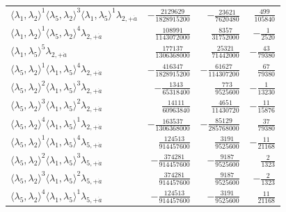 \begin{longtable}{@{}lrrr@{}}
$\langle\lambda_1,\lambda_2\rangle^{1}\langle\lambda_5,\lambda_2\rangle^{3}\langle\lambda_1,\lambda_5\rangle^{1}\lambda_{2,+\dot a}$ & $-\frac{2129629}{1828915200}$ & $-\frac{23621}{7620480}$ & $\frac{499}{105840}$ \\
$\langle\lambda_1,\lambda_2\rangle^{1}\langle\lambda_5,\lambda_2\rangle^{4}\lambda_{2,+\dot a}$ & $\frac{108991}{1143072000}$ & $\frac{8357}{31752000}$ & $-\frac{1}{2520}$ \\
$\langle\lambda_1,\lambda_5\rangle^{5}\lambda_{2,+\dot a}$ & $\frac{177137}{1306368000}$ & $\frac{25321}{71442000}$ & $-\frac{43}{79380}$ \\
$\langle\lambda_5,\lambda_2\rangle^{1}\langle\lambda_1,\lambda_5\rangle^{4}\lambda_{2,+\dot a}$ & $-\frac{416347}{1828915200}$ & $-\frac{61627}{114307200}$ & $\frac{67}{79380}$ \\
$\langle\lambda_5,\lambda_2\rangle^{2}\langle\lambda_1,\lambda_5\rangle^{3}\lambda_{2,+\dot a}$ & $-\frac{1343}{65318400}$ & $\frac{773}{9525600}$ & $-\frac{1}{13230}$ \\
$\langle\lambda_5,\lambda_2\rangle^{3}\langle\lambda_1,\lambda_5\rangle^{2}\lambda_{2,+\dot a}$ & $\frac{14111}{60963840}$ & $\frac{4651}{11430720}$ & $-\frac{11}{15876}$ \\
$\langle\lambda_5,\lambda_2\rangle^{4}\langle\lambda_1,\lambda_5\rangle^{1}\lambda_{2,+\dot a}$ & $-\frac{163537}{1306368000}$ & $-\frac{85129}{285768000}$ & $\frac{37}{79380}$ \\
$\langle\lambda_5,\lambda_2\rangle^{1}\langle\lambda_1,\lambda_5\rangle^{4}\lambda_{5,+\dot a}$ & $\frac{124513}{914457600}$ & $\frac{3191}{9525600}$ & $-\frac{11}{21168}$ \\
$\langle\lambda_5,\lambda_2\rangle^{2}\langle\lambda_1,\lambda_5\rangle^{3}\lambda_{5,+\dot a}$ & $-\frac{374281}{914457600}$ & $-\frac{9187}{9525600}$ & $\frac{2}{1323}$ \\
$\langle\lambda_5,\lambda_2\rangle^{3}\langle\lambda_1,\lambda_5\rangle^{2}\lambda_{5,+\dot a}$ & $\frac{374281}{914457600}$ & $\frac{9187}{9525600}$ & $-\frac{2}{1323}$ \\
$\langle\lambda_5,\lambda_2\rangle^{4}\langle\lambda_1,\lambda_5\rangle^{1}\lambda_{5,+\dot a}$ & $-\frac{124513}{914457600}$ & $-\frac{3191}{9525600}$ & $\frac{11}{21168}$ \\
\end{longtable}
